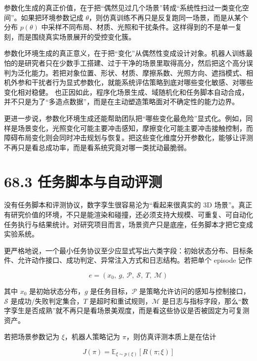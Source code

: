 参数化生成的真正价值，在于把“偶然见过几个场景”转成“系统性扫过一类变化空间”。如果把环境参数记成 \(\theta\)，则仿真训练不再只是反复跑同一场景，而是从某个分布 \(p(\theta)\) 中采样不同布局、材质、光照和干扰条件。这样得到的不是单一复刻，而是围绕真实场景展开的受控变化簇。

参数化环境生成的真正意义，在于把“变化”从偶然性变成设计对象。机器人训练最怕的是研究者只在少数手工搭建、过于干净的场景里取得高分，然后把这个高分误判为泛化能力。若把对象位置、形状、材质、摩擦系数、光照方向、遮挡模式、相机外参和干扰者行为显式参数化，就能系统评估策略到底对哪些变化敏感、对哪些变化相对稳健。 也正因如此，程序化场景生成、域随机化和任务脚本自动合成，并不只是为了“多造点数据”，而是在主动塑造策略面对不确定性的能力边界。

更进一步说，参数化环境生成还能帮助团队把“哪些变化最危险”显式化。例如，同样是场景变化，光照变化可能主要冲击感知，摩擦变化可能主要冲击接触控制，而障碍布局变化则会同时冲击规划与恢复。把这些变化维度分开参数化，能够让评测不再只是看总成功率，而是看系统究竟对哪一类扰动最脆弱。

\section*{68.3 任务脚本与自动评测}


没有任务脚本和评测协议，数字孪生很容易沦为“看起来很真实的 3D 场景”。真正有研究价值的环境，不只是能渲染和碰撞，还必须支持大规模、可重复、可自动化任务执行与结果统计。对研究项目而言，场景资产只是底座，任务脚本才把它变成实验系统。

更严格地说，一个最小任务协议至少应显式写出六类字段：初始状态分布、目标条件、允许动作接口、成功判定、异常注入方式和日志结构。若把单个 episode 记作

\begingroup
\footnotesize
\begin{equation*}
e = (x_0,\ g,\ \mathcal{P},\ \mathcal{S},\ T,\ \mathcal{M})
\end{equation*}
\endgroup

其中 \(x_0\) 是初始状态分布，\(g\) 是任务目标，\(\mathcal{P}\) 是策略允许访问的感知与控制接口，\(\mathcal{S}\) 是成功/失败判定集合，\(T\) 是超时和重试规则，\(\mathcal{M}\) 是日志与指标字段，那么“数字孪生是否成熟”就不再只是看场景美观度，而是看这些协议是否被固定为可复测资产。

若把场景参数记为 \(\xi\)，机器人策略记为 \(\pi\)，则仿真评测本质上是在估计

\begingroup
\footnotesize
\begin{equation*}
J(\pi) = \mathbb{E}_{\xi \sim p(\xi)} \left[ R(\pi; \xi) \right]
\end{equation*}
\endgroup

